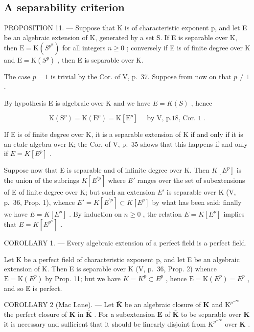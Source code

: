 \subsection{A separability criterion}

PROPOSITION 11. --- Suppose that K is of characteristic exponent p, and let E be an algebraic extension of K, generated by a set S. If E is separable over K, then \(\mathrm{E} = \mathrm{K}(S^{p^{n}})\) for all integers \(n \geqslant 0\) ; conversely if E is of finite degree over K and \(\mathrm{E} = \mathrm{K}(S^{p})\) , then E is separable over K.

The case \(p = 1\) is trivial by the Cor. of V, p.~37. Suppose from now on that \(p \neq 1\) .

By hypothesis E is algebraic over K and we have \(E = K(S)\) , hence

\[
\mathrm{K} \left(\mathrm{S} ^ {p}\right) = \mathrm{K} \left(\mathrm{E} ^ {p}\right) = \mathrm{K} \left[ \mathrm{E} ^ {p} \right] \quad \text { by   V,   p.18,   Cor.   1 }.
\]

If E is of finite degree over K, it is a separable extension of K if and only if it is an etale algebra over K; the Cor. of V, p.~35 shows that this happens if and only if \(E = K[E^{p}]\) .

Suppose now that E is separable and of infinite degree over K. Then \(K[E^{p}]\) is the union of the subrings \(K[E^{\prime p}]\) where \(E'\) ranges over the set of subextensions of E of finite degree over K; but such an extension \(E'\) is separable over K (V, p.~36, Prop. 1), whence \(E' = K[E^{\prime p}] \subset K[E^{p}]\) by what has been said; finally we have \(E = K[E^{p}]\) . By induction on \(n \geqslant 0\) , the relation \(E = K[E^{p}]\) implies that \(E = K[E^{p^{n}}]\) .

COROLLARY 1. --- Every algebraic extension of a perfect field is a perfect field.

Let K be a perfect field of characteristic exponent p, and let E be an algebraic extension of K. Then E is separable over K (V, p.~36, Prop. 2) whence \(\mathrm{E} = \mathrm{K}(E^{p})\) by Prop. 11; but we have \(K = K^{p} \subset E^{p}\) , hence \(\mathrm{E} = \mathrm{K}(E^{p}) = E^{p}\) , and so E is perfect.

COROLLARY 2 (Mac Lane). --- Let \(\bar{\mathbf{K}}\) be an algebraic closure of \(\mathbf{K}\) and \(\mathrm{K}^{p^{-\infty}}\) the perfect closure of \(\mathbf{K}\) in \(\bar{\mathbf{K}}\) . For a subextension \(\mathbf{E}\) of \(\bar{\mathbf{K}}\) to be separable over \(\mathbf{K}\) it is necessary and sufficient that it should be linearly disjoint from \(\mathrm{K}^{p^{-\infty}}\) over \(\mathbf{K}\) .


